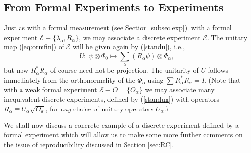 \documentclass[12pt]{article}
\newcommand{\eq}[1]{(\ref{#1})}
\renewcommand{\dagger}{\ast}
\newcommand{\id}{I}
\renewcommand{\a}{\alpha}
\newcommand{\la}{\lambda_{\a}}
\newcommand{\ot}{\otimes}
\newcommand{\Phia}{\Phi_{\a}}
\newcommand{\Aa}{R_{\a}}
\newcommand{\Aad}{R^{\dagger}_{\a}}
\newcommand{\E}{\mbox{$\mathscr{E}$}}
\newcommand{\Ex}{\mbox{$\mathcal{E}$}}
\begin{document}
\subsection{From Formal Experiments to Experiments}\label{subsec.ffete}
\label{subsec.repexp}

Just as with a formal measurement (see Section \ref{subsec.exp}), with
a formal experiment $ \Ex\equiv\{\la, \Aa \}$, we may associate a
discrete experiment \E{}.  The unitary map (\ref{eq:ormfin}) of \E{}
will be given again by (\ref{standu}), i.e.,
\begin{equation}
U: \;\psi \ot \Phi_0  \mapsto
\sum_{\a} (\Aa\psi) \ot \Phia,
\label{standun}
\end{equation}
but now $\Aad\Aa$ of course need not be projection.  The unitarity of
$U$ follows immediately {}from the orthonormality of the $\Phia$ using
$\sum \Aad \Aa = \id $.  (Note that with a weak formal experiment
$\Ex\equiv O=\{O_{\a}\}$ we may associate many inequivalent discrete
experiments, defined by \eq{standun} with operators $\Aa\equiv
U_\alpha \sqrt{O_\alpha}$, for \emph{any} choice of unitary operators
$U_\a$.)

We shall now discuss a concrete example of a discrete experiment
defined by a formal experiment which will allow us to make some more
further comments on the issue of reproducibility discussed in Section
\ref{sec:RC}.
\end{document}
